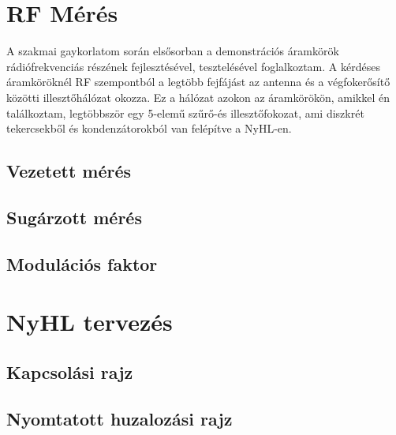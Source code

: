 \documentclass[a4paper,12pt,titlepage]{article}
\begin{document}
	\section{RF Mérés}
		A szakmai gaykorlatom során elsősorban a demonstrációs áramkörök rádiófrekvenciás részének fejlesztésével, tesztelésével foglalkoztam. A kérdéses áramköröknél RF szempontból a legtöbb fejfájást az antenna és a végfokerősítő közötti illesztőhálózat okozza. Ez a hálózat azokon az áramkörökön, amikkel én találkoztam, legtöbbször egy 5-elemű szűrő-és illesztőfokozat, ami diszkrét tekercsekből és kondenzátorokból van felépítve a NyHL-en.
		\subsection{Vezetett mérés}
		\subsection{Sugárzott mérés}
		\subsection{Modulációs faktor}
	\section{NyHL tervezés}
		\subsection{Kapcsolási rajz}
		\subsection{Nyomtatott huzalozási rajz}
\end{document}
